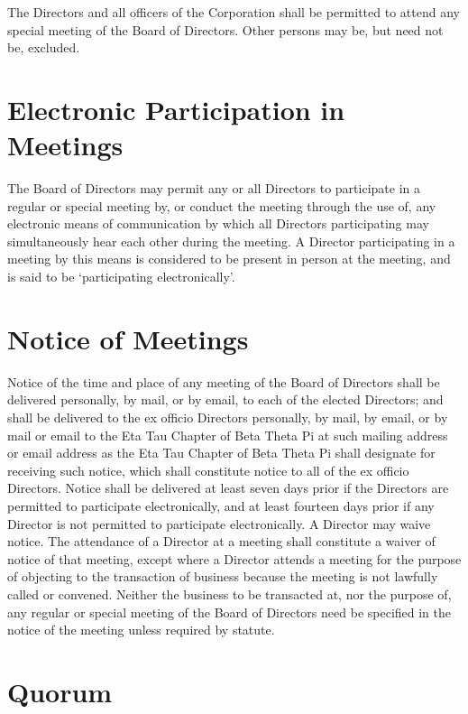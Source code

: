 The Directors and all officers of the Corporation shall be permitted to attend
any special meeting of the Board of Directors.  Other persons may be, but need
not be, excluded.

\section{Electronic Participation in Meetings}

The Board of Directors may permit any or all Directors to participate in a
regular or special meeting by, or conduct the meeting through the use of, any
electronic means of communication by which all Directors participating may
simultaneously hear each other during the meeting. A Director participating in a
meeting by this means is considered to be present in person at the meeting, and
is said to be `participating electronically'.


\section{Notice of Meetings}

Notice of the time and place of any meeting of the Board of Directors shall be
delivered personally, by mail, or by email, to each of the elected Directors;
and shall be delivered to the ex officio Directors personally, by mail, by
email, or by mail or email to the Eta Tau Chapter of Beta Theta Pi at such
mailing address or email address as the Eta Tau Chapter of Beta Theta Pi shall
designate for receiving such notice, which shall constitute notice to all of the
ex officio Directors. Notice shall be delivered at least
seven days prior if the Directors are permitted to participate electronically,
and at least fourteen days prior if any Director is not permitted to participate
electronically. A Director may waive notice. The attendance of a Director at a
meeting shall constitute a waiver of notice of that meeting, except where a
Director attends a meeting for the purpose of objecting to the transaction of
business because the meeting is not lawfully called or convened. Neither the
business to be transacted at, nor the purpose of, any regular or special meeting
of the Board of Directors need be specified in the notice of the meeting unless
required by statute.

\section{Quorum}

